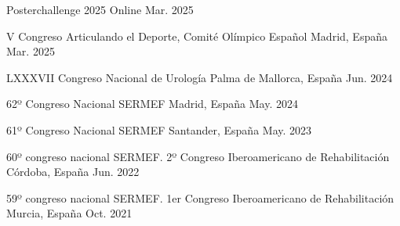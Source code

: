 

\begin{cvhonors}
  \cvhonor
    {Posterchallenge 2025} %
    {Online} %
    {}
    {Mar. 2025} %

  \cvhonor
    {V Congreso Articulando el Deporte, Comité Olímpico Español} %
    {Madrid, España} %
    {}
    {Mar. 2025} %

  \cvhonor
    {LXXXVII Congreso Nacional de Urología} %
    {Palma de Mallorca, España} %
    {}
    {Jun. 2024} %

  \cvhonor
    {62º Congreso Nacional SERMEF} %
    {Madrid, España} %
    {}
    {May. 2024} %

  \cvhonor
    {61º Congreso Nacional SERMEF} %
    {Santander, España} %
    {}
    {May. 2023} %

  \cvhonor
    {60º congreso nacional SERMEF. 2º Congreso Iberoamericano de Rehabilitación} %
    {Córdoba, España} %
    {}
    {Jun. 2022} %

  \cvhonor
    {59º congreso nacional SERMEF. 1er Congreso Iberoamericano de Rehabilitación} %
    {Murcia, España} %
    {}
    {Oct. 2021} %
\end{cvhonors}
